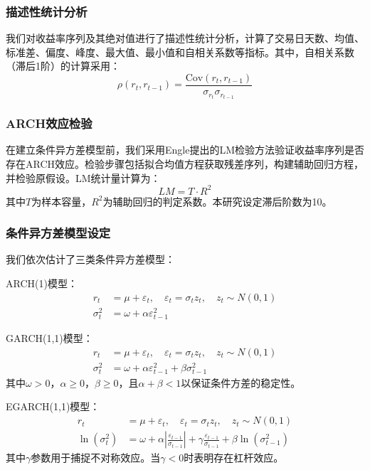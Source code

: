 \documentclass[12pt, a4paper]{article}
\begin{document}
\subsubsection{描述性统计分析}
我们对收益率序列及其绝对值进行了描述性统计分析，计算了交易日天数、均值、标准差、偏度、峰度、最大值、最小值和自相关系数等指标。其中，自相关系数（滞后1阶）的计算采用：
\begin{equation}
\rho(r_t, r_{t-1}) = \frac{\text{Cov}(r_t, r_{t-1})}{\sigma_{r_t} \sigma_{r_{t-1}}}
\end{equation}

\subsubsection{ARCH效应检验}
在建立条件异方差模型前，我们采用Engle提出的LM检验方法验证收益率序列是否存在ARCH效应。检验步骤包括拟合均值方程获取残差序列，构建辅助回归方程，并检验原假设。LM统计量计算为：
\begin{equation}
LM = T \cdot R^2
\end{equation}
其中$T$为样本容量，$R^2$为辅助回归的判定系数。本研究设定滞后阶数为10。

\subsubsection{条件异方差模型设定}
我们依次估计了三类条件异方差模型：

ARCH(1)模型：
\begin{equation}
\begin{aligned}
r_t &= \mu + \varepsilon_t, \quad \varepsilon_t = \sigma_t z_t, \quad z_t \sim N(0,1) \\
\sigma_t^2 &= \omega + \alpha \varepsilon_{t-1}^2
\end{aligned}
\end{equation}

GARCH(1,1)模型：
\begin{equation}
\begin{aligned}
r_t &= \mu + \varepsilon_t, \quad \varepsilon_t = \sigma_t z_t, \quad z_t \sim N(0,1) \\
\sigma_t^2 &= \omega + \alpha \varepsilon_{t-1}^2 + \beta \sigma_{t-1}^2
\end{aligned}
\end{equation}
其中$\omega > 0$，$\alpha \geq 0$，$\beta \geq 0$，且$\alpha + \beta < 1$以保证条件方差的稳定性。

EGARCH(1,1)模型：
\begin{equation}
\begin{aligned}
r_t &= \mu + \varepsilon_t, \quad \varepsilon_t = \sigma_t z_t, \quad z_t \sim N(0,1) \\
\ln(\sigma_t^2) &= \omega + \alpha \left| \frac{\varepsilon_{t-1}}{\sigma_{t-1}} \right| + \gamma \frac{\varepsilon_{t-1}}{\sigma_{t-1}} + \beta \ln(\sigma_{t-1}^2)
\end{aligned}
\end{equation}
其中$\gamma$参数用于捕捉不对称效应。当$\gamma < 0$时表明存在杠杆效应。
\end{document}
